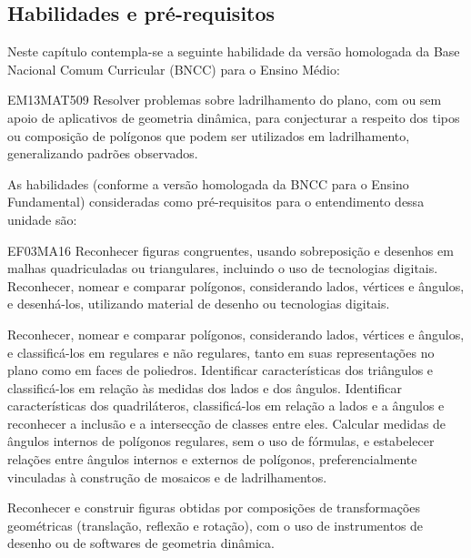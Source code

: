 \mainmatter

\begin{apresentacao}
\section*{Habilidades e pré-requisitos}

Neste capítulo contempla-se a seguinte habilidade da versão homologada da Base Nacional Comum Curricular (BNCC) para o Ensino Médio:

\begin{habilities}{EM13MAT509}
Resolver problemas sobre ladrilhamento do plano, com ou sem apoio de aplicativos de geometria dinâmica, para conjecturar a respeito dos tipos ou composição de polígonos que podem ser utilizados em ladrilhamento, generalizando padrões observados.
\end{habilities}

 
As habilidades (conforme a versão homologada da BNCC para o Ensino Fundamental) consideradas como pré-requisitos para o entendimento dessa unidade são:

\begin{habilities}{EF03MA16}
Reconhecer figuras congruentes, usando sobreposição e desenhos em malhas quadriculadas ou triangulares, incluindo o uso de tecnologias digitais.
 Reconhecer, nomear e comparar polígonos, considerando lados, vértices e ângulos, e desenhá-los, utilizando material de desenho ou tecnologias digitais.

 Reconhecer, nomear e comparar polígonos, considerando lados, vértices e ângulos, e classificá-los em regulares e não regulares, tanto em suas representações no plano como em faces de poliedros.
 Identificar características dos triângulos e classificá-los em relação às medidas dos lados e dos ângulos.
 Identificar características dos quadriláteros, classificá-los em relação a lados e a ângulos e reconhecer a inclusão e a intersecção de classes entre eles.
 Calcular medidas de ângulos internos de polígonos regulares, sem o uso de fórmulas, e estabelecer relações entre ângulos internos e externos de polígonos,
preferencialmente vinculadas à construção de mosaicos e de ladrilhamentos.

 Reconhecer e construir figuras obtidas por composições de transformações geométricas (translação, reflexão e rotação), com o uso de instrumentos de desenho ou de softwares de geometria dinâmica.
\end{habilities}





\end{apresentacao}
